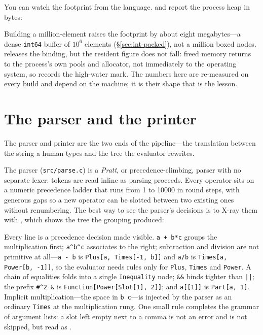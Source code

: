 You can watch the footprint from the language.  and 
report the process heap in bytes:


Building a million-element  raises the footprint by about eight
megabytes---a dense \texttt{int64} buffer of \(10^6\) elements
(\S\ref{sec:int-packed}), not a million boxed nodes.  releases the binding,
but the resident figure does not fall: freed memory returns to the process's own pools
and allocator, not immediately to the operating system, so  records
the high-water mark. The numbers here are re-measured on every build and depend on the
machine; it is their shape that is the lesson.

\section{The parser and the printer}
\label{sec:int-parse}

The parser and printer are the two ends of the pipeline---the translation between the
string a human types and the tree the evaluator rewrites.

The parser (\texttt{src/parse.c}) is a \emph{Pratt}, or precedence-climbing, parser
with no separate lexer: tokens are read inline as parsing proceeds. Every operator
sits on a numeric precedence ladder that runs from 1 to 10000 in round steps, with
generous gaps so a new operator can be slotted between two existing ones without
renumbering. The best way to see the parser's decisions is to X-ray them with
, which shows the tree the grouping produced:


Every line is a precedence decision made visible. \texttt{a + b*c} groups the
multiplication first; \texttt{a\^{}b\^{}c} associates to the right; subtraction and
division are not primitive at all---\texttt{a - b} is \texttt{Plus[a, Times[-1, b]]}
and \texttt{a/b} is \texttt{Times[a, Power[b, -1]]}, so the evaluator needs rules only
for \texttt{Plus}, \texttt{Times} and \texttt{Power}. A chain of equalities folds into
a single \texttt{Inequality} node; \texttt{\&\&} binds tighter than \texttt{||}; the
prefix \texttt{\#\^{}2 \&} is \texttt{Function[Power[Slot[1], 2]]}; and
\texttt{a[[1]]} is \texttt{Part[a, 1]}. Implicit multiplication---the space in
\texttt{b c}---is injected by the parser as an ordinary \texttt{Times} at the
multiplication rung. One small rule completes the grammar of argument lists: a slot
left empty next to a comma is not an error and is not skipped, but read as
.

